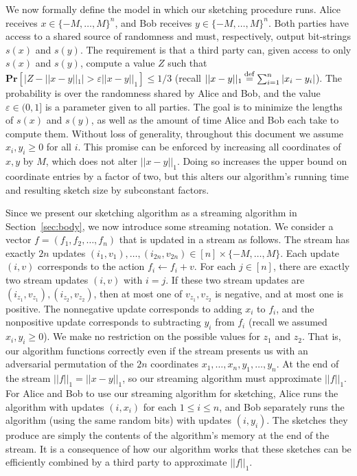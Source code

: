 \documentclass[letterpaper,11pt]{article}
\newcommand{\eps}{\varepsilon}
\renewcommand{\Pr}{\mathbf{Pr}}
\newcommand{\Section}[1]{Section~\ref{sec:#1}}
\newcommand{\eqdef}{\mathbin{\stackrel{\rm def}{=}}}
\begin{document}
We now formally define the model in which our sketching procedure
runs. Alice receives $x\in\{-M,\ldots,M\}^n$, and Bob receives
$y\in\{-M,\ldots,M\}^n$. Both parties have access to a shared source of
randomness and must, respectively, output bit-strings $s(x)$ and
$s(y)$.
The requirement is that a third party can, given access to only $s(x)$
and $s(y)$, compute a value $Z$ such that $\Pr[|Z-||x-y||_1| >
\eps||x-y||_1] \le 1/3$ (recall $||x-y||_1\eqdef \sum_{i=1}^n |x_i -
y_i|$). The probability is over the randomness shared by Alice and
Bob, and the value $\eps\in (0,1]$ is a parameter given to all
parties. The goal is to minimize the lengths of $s(x)$ and $s(y)$, as
well
as the amount of time Alice and Bob each take to compute them.
Without loss of generality, throughout this
document we assume $x_i,y_i\ge 0$ for all $i$.  This promise can be
enforced by increasing all coordinates of $x,y$ by $M$, which
does not alter $||x-y||_1$.  Doing so increases the upper bound on
coordinate entries by a factor of two, but this alters our algorithm's
running time and resulting sketch size
by subconstant factors.

Since we present our sketching algorithm as a streaming algorithm
in \Section{body}, we now introduce some streaming notation.
We consider a vector $f = (f_1,f_2,\ldots,f_n)$ that is updated in a
stream as follows. The stream has
exactly $2n$ updates $(i_1,v_1),\ldots,(i_{2n},v_{2n})\in
[n]\times\{-M,\ldots,M\}$. Each update $(i,v)$ corresponds to the
action $f_i\leftarrow f_i + v$.
For each $j\in[n]$, there are exactly two
stream updates $(i,v)$ with $i=j$.  If these two stream updates are
$(i_{z_1},v_{z_1}), (i_{z_2},v_{z_2})$, then at most
one of $v_{z_1},v_{z_2}$ is negative, and at most one is positive. The
nonnegative update corresponds to adding $x_i$ to $f_i$, and the
nonpositive update corresponds to subtracting $y_i$ from $f_i$ (recall
we assumed $x_i,y_i\ge 0$). We make no restriction on the
possible values for $z_1$ and $z_2$. That is, our algorithm
functions correctly even if the stream
presents us with an adversarial permutation of the $2n$ coordinates
$x_1,\ldots,x_n,y_1,\ldots,y_n$. At the end of the stream $||f||_1 =
||x-y||_1$, so our streaming algorithm must
approximate $||f||_1$. For Alice and Bob to use our streaming
algorithm for sketching, Alice runs the algorithm with updates
$(i,x_i)$ for each $1\le i\le n$, and Bob separately runs the
algorithm (using the same random bits) with updates $(i,y_i)$. The
sketches they produce are simply the contents of the algorithm's
memory at the end of the stream.  It is a consequence of how our
algorithm works that these sketches can be
efficiently combined by a third party to approximate $||f||_1$.
\end{document}

